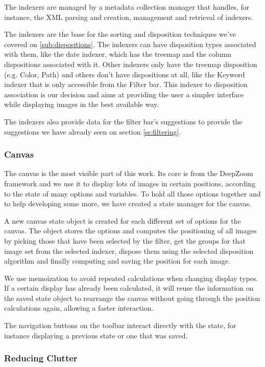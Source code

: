The indexers are managed by a metadata collection manager that handles, for instance, the XML parsing and creation, management and retrieval of indexers.

The indexers are the base for the sorting and disposition techniques we've covered on \ref{sub:dispositions}. The indexers can have disposition types associated with them, like the date indexer, which has the treemap and the column dispositions associated with it. Other indexers only have the treemap disposition (e.g. Color, Path) and others don't have dispositions at all, like the Keyword indexer that is only accessible from the Filter bar. This indexer to disposition association is our decision and aims at providing the user a simpler interface while displaying images in the best available way.

The indexers also provide data for the filter bar's suggestions to provide the suggestions we have already seen on section \ref{ss:filtering}.


\subsubsection{Canvas}

The canvas is the most visible part of this work. Its core is from the DeepZoom framework and we use it to display lots of images in certain positions, according to the state of many options and variables. To hold all those options together and to help developing some more, we have created a state manager for the canvas.

A new canvas state object is created for each different set of options for the canvas. The object stores the options and computes the positioning of all images by picking those that have been selected by the filter, get the groups for that image set from the selected indexer, dispose them using the selected disposition algorithm and finally computing and saving the position for each image.

We use memoization to avoid repeated calculations when changing display types. If a certain display has already been calculated, it will reuse the information on the saved state object to rearrange the canvas without going through the position calculations again, allowing a faster interaction.

The navigation buttons on the toolbar interact directly with the state, for instance displaying a previous state or one that was saved.


\subsubsection{Reducing Clutter}
\label{ss:stacks}

